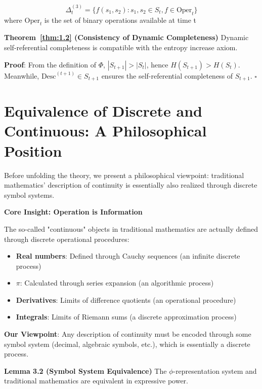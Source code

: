 \begin{equation}
\Delta_t^{(3)} = \{f(s_1, s_2) : s_1, s_2 \in S_t, f \in \text{Oper}_t\}
\end{equation}
   where $\text{Oper}_t$ is the set of binary operations available at time t

\textbf{Theorem~\ref{thm:1.2} (Consistency of Dynamic Completeness)}
\label{thm:1.2}
Dynamic self-referential completeness is compatible with the entropy increase axiom.

\textbf{Proof}:
From the definition of $\Phi$, $|S_{t+1}| > |S_t|$, hence $H(S_{t+1}) > H(S_t)$.
Meanwhile, $\text{Desc}^{(t+1)} \in S_{t+1}$ ensures the self-referential completeness of $S_{t+1}$. $\square$

\section{Equivalence of Discrete and Continuous: A Philosophical Position}
\label{sec:ch03_derivation:equivalence-of-discrete-and-continuous-a-philosophical-position}

Before unfolding the theory, we present a philosophical viewpoint: traditional mathematics' description of continuity is essentially also realized through discrete symbol systems.

\textbf{Core Insight: Operation is Information}

The so-called "continuous" objects in traditional mathematics are actually defined through discrete operational procedures:
\begin{itemize}
\item \textbf{Real numbers}: Defined through Cauchy sequences (an infinite discrete process)
\item \textbf{$\pi$}: Calculated through series expansion (an algorithmic process)
\item \textbf{Derivatives}: Limits of difference quotients (an operational procedure)
\item \textbf{Integrals}: Limits of Riemann sums (a discrete approximation process)
\end{itemize}

\textbf{Our Viewpoint}: Any description of continuity must be encoded through some symbol system (decimal, algebraic symbols, etc.), which is essentially a discrete process.

\textbf{Lemma 3.2 (Symbol System Equivalence)}
\label{thm:1.3}
The $\phi$-representation system and traditional mathematics are equivalent in expressive power.


